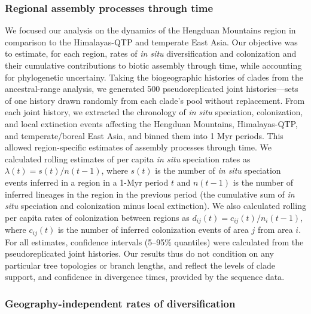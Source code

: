 \documentclass[9pt,twocolumn,twoside,lineno]{pnas-new}
\begin{document}
{\subsubsection*{Regional assembly processes through time}

We focused our analysis on the dynamics of the Hengduan Mountains
region in comparison to the Himalayas-QTP and temperate East Asia. Our
objective was to estimate, for each region, rates of \textit{in situ}
diversification and colonization and their cumulative contributions to
biotic assembly through time, while accounting for phylogenetic
uncertainy. Taking the biogeographic histories of clades from the
ancestral-range analysis, we generated 500 pseudoreplicated joint
histories---sets of one history drawn randomly from each clade's pool
without replacement. From each joint history, we extracted the
chronology of \textit{in situ} speciation, colonization, and local
extinction events affecting the Hengduan Mountains, Himalayas-QTP, and
temperate/boreal East Asia, and binned them into 1 Myr periods. This
allowed region-specific estimates of assembly processes through
time. We calculated rolling estimates of per capita \textit{in situ}
speciation rates as $\lambda(t) = s(t)/n(t-1)$, where $s(t)$ is the
number of \textit{in situ} speciation events inferred in a region in a
1-Myr period $t$ and $n(t-1)$ is the number of inferred lineages in
the region in the previous period (the cumulative sum of \textit{in
  situ} speciation and colonization minus local extinction). We also
calculated rolling per capita rates of colonization between regions as
$d_{ij}(t) = c_{ij}(t)/n_i(t-1)$, where $c_{ij}(t)$ is the number of
inferred colonization events of area $j$ from area $i$. For all
estimates, confidence intervals (5--95\% quantiles) were calculated
from the pseudoreplicated joint histories. Our results thus do not
condition on any particular tree topologies or branch lengths, and
reflect the levels of clade support, and confidence in divergence
times, provided by the sequence data.

\subsubsection*{Geography-independent rates of diversification}

}
\end{document}
